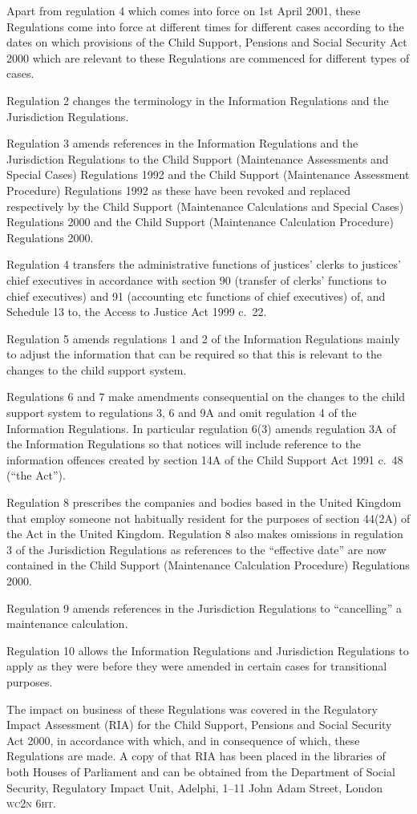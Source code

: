 \documentclass[12pt,a4paper]{article}
\begin{document}
Apart from regulation 4 which comes into force on 1st April 2001, these Regulations come into force at different times for different cases according to the dates on which provisions of the Child Support, Pensions and Social Security Act 2000 which are relevant to these Regulations are commenced for different types of cases.

Regulation 2 changes the terminology in the Information Regulations and the Jurisdiction Regulations.

Regulation 3 amends references in the Information Regulations and the Jurisdiction Regulations to the Child Support (Maintenance Assessments and Special Cases) Regulations 1992 and the Child Support (Maintenance Assessment Procedure) Regulations 1992 as these have been revoked and replaced respectively by the Child Support (Maintenance Calculations and Special Cases) Regulations 2000 and the Child Support (Maintenance Calculation Procedure) Regulations 2000.

Regulation 4 transfers the administrative functions of justices' clerks to justices' chief executives in accordance with section 90 (transfer of clerks' functions to chief executives) and 91 (accounting etc functions of chief executives) of, and Schedule 13 to, the Access to Justice Act 1999 c.\ 22.

Regulation 5 amends regulations 1 and 2 of the Information Regulations mainly to adjust the information that can be required so that this is relevant to the changes to the child support system.

Regulations 6 and 7 make amendments consequential on the changes to the child support system to regulations 3, 6 and 9A and omit regulation 4 of the Information Regulations. In particular regulation 6(3) amends regulation 3A of the Information Regulations so that notices will include reference to the information offences created by section 14A of the Child Support Act 1991 c.\ 48 (“the Act”).

Regulation 8 prescribes the companies and bodies based in the United Kingdom that employ someone not habitually resident for the purposes of section 44(2A) of the Act in the United Kingdom. Regulation 8 also makes omissions in regulation 3 of the Jurisdiction Regulations as references to the “effective date” are now contained in the Child Support (Maintenance Calculation Procedure) Regulations 2000.

Regulation 9 amends references in the Jurisdiction Regulations to “cancelling” a maintenance calculation.

Regulation 10 allows the Information Regulations and Jurisdiction Regulations to apply as they were before they were amended in certain cases for transitional purposes.

The impact on business of these Regulations was covered in the Regulatory Impact Assessment (RIA) for the Child Support, Pensions and Social Security Act 2000, in accordance with which, and in consequence of which, these Regulations are made. A copy of that RIA has been placed in the libraries of both Houses of Parliament and can be obtained from the Department of Social Security, Regulatory Impact Unit, Adelphi, 1--11 John Adam Street, London \textsc{\lowercase{WC2N 6HT}}. 
\end{document}
